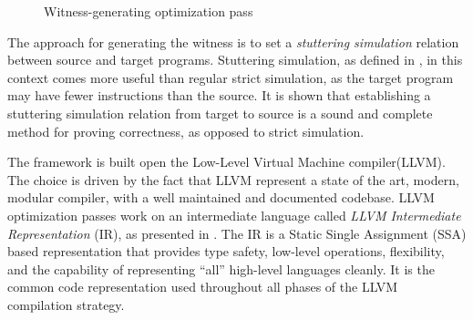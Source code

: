 \begin{figure}[b]
  \begin{mdframed}
  \centering
  \end{mdframed}
  \caption{Witness-generating optimization pass}
  \label{fig:arch1}
\end{figure}

The approach for generating the witness is to set a \emph{stuttering simulation} relation between source and target programs. Stuttering simulation, as defined in \cite{namjoshi1997simple}, in this context comes more useful than regular strict simulation, as the target program may have fewer instructions than the source. It is shown \cite{zuck2005translation} that establishing a stuttering simulation relation from target to source is a sound and complete method for proving correctness, as opposed to strict simulation.

The framework is built open the Low-Level Virtual Machine compiler(LLVM). The choice is driven by the fact that LLVM represent a state of the art, modern, modular compiler, with a well maintained and documented codebase. LLVM optimization passes work on an intermediate language called \emph{LLVM Intermediate Representation} (IR), as presented in \cite{lattner2004llvm}. The IR is a Static Single Assignment (SSA) based representation that provides type safety, low-level operations, flexibility, and the capability of representing ``all'' high-level languages cleanly. It is the common code representation used throughout all phases of the LLVM compilation strategy.

